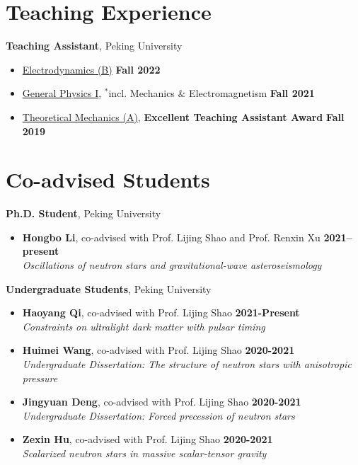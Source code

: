 \documentclass[margin,line]{res}
\begin{document}
\begin{resume}
\vspace{-1em}

\section{\sc Teaching Experience}

{\bf Teaching Assistant}, Peking University
\vspace*{.05in}
\begin{itemize}
  \item[ ] \href{http://friendshao.github.io/teaching/ced22/}{Electrodynamics (B)} \hfill {\bf Fall 2022}
\item[ ] \href{http://friendshao.github.io/teaching/phy21/}{General Physics I}, $^{*}${\small incl. Mechanics $\&$ Electromagnetism} \hfill {\bf Fall 2021}
\item[ ] \href{http://friendshao.github.io/teaching/thmech19/}{Theoretical Mechanics (A)}, {\small{\bf Excellent Teaching Assistant Award}} \hfill {\bf Fall 2019}
\end{itemize}

\section{\sc Co-advised Students}

{\bf Ph.D. Student}, Peking University
\vspace*{.05in}
\begin{itemize}
\item[] {\bf Hongbo Li}, co-advised with Prof. Lijing Shao and Prof. Renxin Xu 
\hfill {\bf 2021--present} \\
\vspace*{.05in}
{\it  Oscillations of neutron stars and gravitational-wave asteroseismology}
\end{itemize}
{\bf Undergraduate Students}, Peking University
\vspace*{.05in}
\begin{itemize}
\item[] {\bf Haoyang Qi}, co-advised with Prof. Lijing Shao
\hfill {\bf 2021-Present}\\
{\it Constraints on ultralight dark matter with pulsar timing}
\item[] {\bf Huimei Wang}, co-advised with Prof. Lijing Shao 
\hfill {\bf 2020-2021}\\
{\it Undergraduate Dissertation: The structure of neutron stars with anisotropic pressure}
\item[] {\bf Jingyuan Deng}, co-advised with Prof. Lijing Shao 
\hfill {\bf 2020-2021}\\
{\it Undergraduate Dissertation: Forced precession of neutron stars}
\item[] {\bf Zexin Hu}, co-advised with Prof. Lijing Shao
\hfill {\bf 2020-2021}\\
{\it Scalarized neutron stars in massive scalar-tensor gravity}
\end{itemize}


\end{resume}
\end{document}
